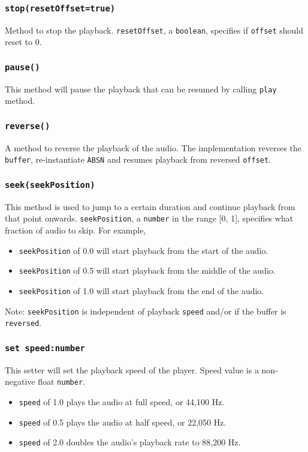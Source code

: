 \documentclass[20pt]{article}
\begin{document}
\subsubsection*{\texttt{stop(resetOffset=true)}}
Method to stop the playback. \texttt{resetOffset}, a \texttt{boolean}, specifies if \texttt{offset} should reset to 0.

\subsubsection*{\texttt{pause()}}
This method will pause the playback that can be resumed by calling \texttt{play} method.

\subsubsection*{\texttt{reverse()}}
A method to reverse the playback of the audio. The implementation reverses the \texttt{buffer}, re-instantiate \texttt{ABSN} and resumes playback from reversed \texttt{offset}.

\subsubsection*{\texttt{seek(seekPosition)}}
This method is used to jump to a certain duration and continue playback from that point onwards. \texttt{seekPosition}, a \texttt{number} in the range [0, 1], specifies what fraction of audio to skip. For example, 
\begin{itemize}
\item \texttt{seekPosition} of 0.0 will start playback from the start of the audio.
\item \texttt{seekPosition} of 0.5 will start playback from the middle of the audio.
\item \texttt{seekPosition} of 1.0 will start playback from the end of the audio.
\end{itemize}

Note: \texttt{seekPosition} is independent of playback \texttt{speed} and/or if the buffer is \texttt{reversed}.

\subsubsection*{\texttt{set speed:number}}
This setter will set the playback speed of the player. Speed value is a non-negative float \texttt{number}. 
\begin{itemize}
\item \texttt{speed} of 1.0 plays the audio at full speed, or 44,100 Hz.
\item \texttt{speed} of 0.5 plays the audio at half speed, or 22,050 Hz.
\item \texttt{speed} of 2.0 doubles the audio's playback rate to 88,200 Hz.
\end{itemize}
\end{document}
